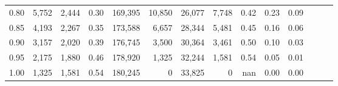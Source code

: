\begin{tabular}{rrrrrrrrrrrrrr}
0.80 &   5,752 &  2,444 &  0.30 &  169,395 &   10,850 &  26,077 &   7,748 &  0.42 &  0.23 &      0.09 \\
0.85 &   4,193 &  2,267 &  0.35 &  173,588 &    6,657 &  28,344 &   5,481 &  0.45 &  0.16 &      0.06 \\
0.90 &   3,157 &  2,020 &  0.39 &  176,745 &    3,500 &  30,364 &   3,461 &  0.50 &  0.10 &      0.03 \\
0.95 &   2,175 &  1,880 &  0.46 &  178,920 &    1,325 &  32,244 &   1,581 &  0.54 &  0.05 &      0.01 \\
1.00 &   1,325 &  1,581 &  0.54 &  180,245 &        0 &  33,825 &       0 &   nan &  0.00 &      0.00 \\
\bottomrule
\end{tabular}
